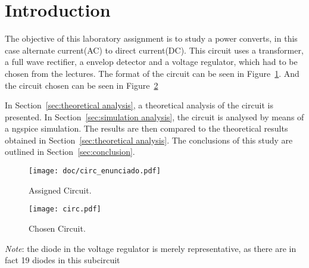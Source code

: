 \section{Introduction}
\label{sec:introduction}

The objective of this laboratory assignment is to study a power converts, in this case alternate current(AC) to direct current(DC).
This circuit uses a transformer, a full wave rectifier, a envelop detector and a voltage regulator, which had to be chosen from the lectures.
The format of the circuit can be seen in Figure~\ref{fig:format}. And the circuit chosen can be seen in Figure~\ref{fig:circuit}

In Section~\ref{sec:theoretical analysis}, a theoretical analysis of the circuit is
presented. In Section~\ref{sec:simulation analysis}, the circuit is analysed by
means of a ngspice simulation. The results are then compared to the theoretical results obtained in
Section~\ref{sec:theoretical analysis}. The conclusions of this study are outlined in
Section~\ref{sec:conclusion}.



\begin{figure}[h!] \centering
	\texttt{[image: doc/circ\_enunciado.pdf]}
	\caption{Assigned Circuit.}
	\label{fig:format}
\end{figure}

\begin{figure}[h!] \centering
	\texttt{[image: circ.pdf]}
	\caption{Chosen Circuit.}
	\label{fig:circuit}
\end{figure}

\emph{Note}: the diode in the voltage regulator is merely representative, as there are in fact 19 diodes in this subcircuit

